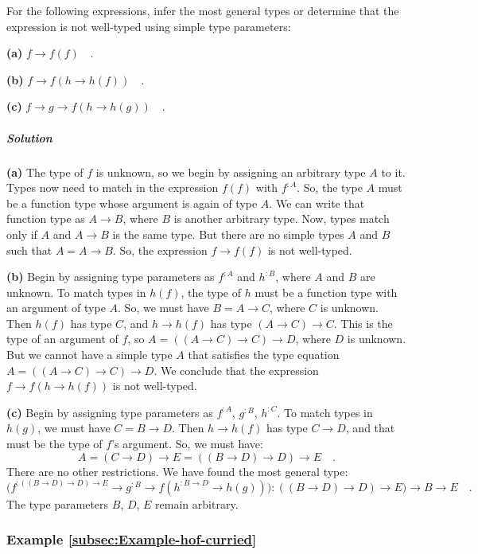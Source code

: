 For the following expressions, infer the most general types or determine
that the expression is not well-typed using simple type parameters:

\textbf{(a)} $f\rightarrow f(f)\quad.$

\textbf{(b)} $f\rightarrow f(h\rightarrow h(f))\quad.$

\textbf{(c)} $f\rightarrow g\rightarrow f(h\rightarrow h(g))\quad.$

\subparagraph{Solution}

\textbf{(a)} The type of $f$ is unknown, so we begin by assigning
an arbitrary type $A$ to it. Types now need to match in the expression
$f(f)$ with $f^{:A}$. So, the type $A$ must be a function type
whose argument is again of type $A$. We can write that function type
as $A\rightarrow B$, where $B$ is another arbitrary type. Now, types
match only if $A$ and $A\rightarrow B$ is the same type. But there
are no simple types $A$ and $B$ such that $A=A\rightarrow B$. So,
the expression $f\rightarrow f(f)$ is not well-typed.

\textbf{(b)} Begin by assigning type parameters as $f^{:A}$ and $h^{:B}$,
where $A$ and $B$ are unknown. To match types in $h(f)$, the type
of $h$ must be a function type with an argument of type $A$. So,
we must have $B=A\rightarrow C$, where $C$ is unknown. Then $h(f)$
has type $C$, and $h\rightarrow h(f)$ has type $(A\rightarrow C)\rightarrow C$.
This is the type of an argument of $f$, so $A=((A\rightarrow C)\rightarrow C)\rightarrow D$,
where $D$ is unknown. But we cannot have a simple type $A$ that
satisfies the type equation $A=((A\rightarrow C)\rightarrow C)\rightarrow D$.
We conclude that the expression $f\rightarrow f(h\rightarrow h(f))$
is not well-typed. 

\textbf{(c) }Begin by assigning type parameters as $f^{:A}$, $g^{:B}$,
$h^{:C}$. To match types in $h(g)$, we must have $C=B\rightarrow D$.
Then $h\rightarrow h(f)$ has type $C\rightarrow D$, and that must
be the type of $f$\textsf{'}s argument. So, we must have: 
\[
A=(C\rightarrow D)\rightarrow E=((B\rightarrow D)\rightarrow D)\rightarrow E\quad.
\]
There are no other restrictions. We have found the most general type:
\[
\big(f^{:((B\rightarrow D)\rightarrow D)\rightarrow E}\rightarrow g^{:B}\rightarrow f(h^{:B\rightarrow D}\rightarrow h(g))\big):((B\rightarrow D)\rightarrow D)\rightarrow E)\rightarrow B\rightarrow E\quad.
\]
The type parameters $B$, $D$, $E$ remain arbitrary. 

\subsubsection{Example \label{subsec:Example-hof-curried}\ref{subsec:Example-hof-curried}}

